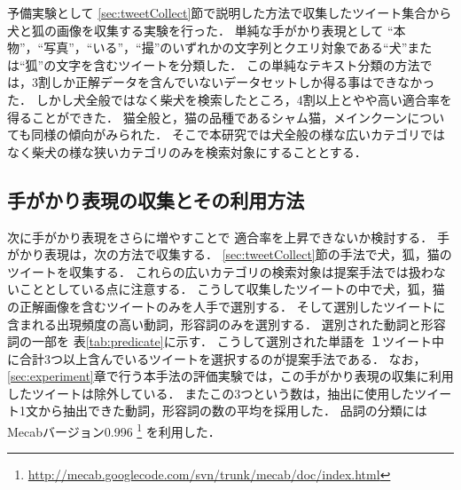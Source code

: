 \documentclass{deimj}
\begin{document}
予備実験として
\ref{sec:tweetCollect}節で説明した方法で収集したツイート集合から
犬と狐の画像を収集する実験を行った．
単純な手がかり表現として
“本物”，“写真”，“いる”，“撮”のいずれかの文字列とクエリ対象である“犬”または“狐”の文字を含むツイートを分類した．
この単純なテキスト分類の方法では，3割しか正解データを含んでいないデータセットしか得る事はできなかった．
しかし犬全般ではなく柴犬を検索したところ，4割以上とやや高い適合率を得ることができた．
猫全般と，猫の品種であるシャム猫，メインクーンについても同様の傾向がみられた．
そこで本研究では犬全般の様な広いカテゴリではなく柴犬の様な狭いカテゴリのみを検索対象にすることとする．



\subsection{手がかり表現の収集とその利用方法}

次に手がかり表現をさらに増やすことで
適合率を上昇できないか検討する．
手がかり表現は，次の方法で収集する．
%
\ref{sec:tweetCollect}節の手法で犬，狐，猫のツイートを収集する．
これらの広いカテゴリの検索対象は提案手法では扱わないこととしている点に注意する．
こうして収集したツイートの中で犬，狐，猫の正解画像を含むツイートのみを人手で選別する．
そして選別したツイートに含まれる出現頻度の高い動詞，形容詞のみを選別する．
選別された動詞と形容詞の一部を
表\ref{tab:predicate}に示す．
こうして選別された単語を
１ツイート中に合計3つ以上含んでいるツイートを選択するのが提案手法である．
なお，
\ref{sec:experiment}章で行う本手法の評価実験では，この手がかり表現の収集に利用したツイートは除外している．
またこの3つという数は，抽出に使用したツイート1文から抽出できた動詞，形容詞の数の平均を採用した．
品詞の分類にはMecabバージョン0.996
\footnote{\url{http://mecab.googlecode.com/svn/trunk/mecab/doc/index.html}}
を利用した．


\end{document}
